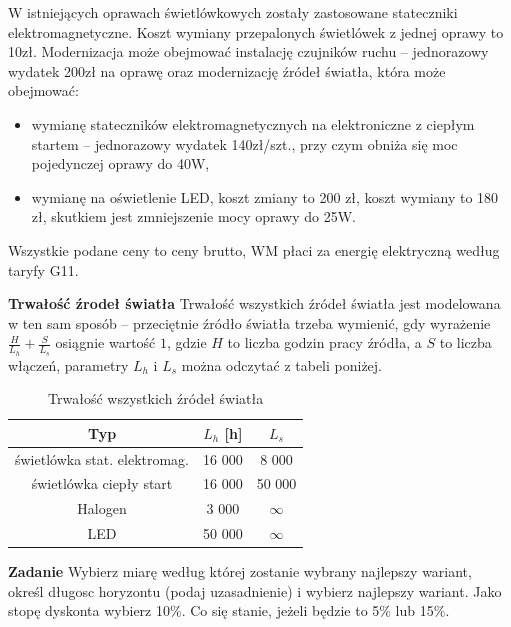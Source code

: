 \documentclass[
    12pt, %
]{../fphw}
\begin{document}
W istniejących oprawach świetlówkowych zostały zastosowane stateczniki elektromagnetyczne. Koszt wymiany przepalonych świetlówek z jednej
oprawy to 10zł. Modernizacja może obejmować instalację czujników ruchu
– jednorazowy wydatek 200zł na oprawę oraz modernizację źródeł światła,
która może obejmować:
\begin{itemize}
    \item wymianę stateczników elektromagnetycznych na elektroniczne z ciepłym startem
          – jednorazowy wydatek 140zł/szt., przy czym obniża się moc pojedynczej oprawy do 40W,
    \item wymianę na oświetlenie LED, koszt zmiany to 200 zł, koszt wymiany
          to 180 zł, skutkiem jest zmniejszenie mocy oprawy do 25W.
\end{itemize}
Wszystkie podane ceny to ceny brutto, WM płaci za energię elektryczną według taryfy G11.

\textbf{Trwałość źrodeł światła}
Trwałość wszystkich źródeł światła jest modelowana
w ten sam sposób – przeciętnie źródło światła trzeba wymienić, gdy
wyrażenie \(\frac{H}{L_h} + \frac{S}{L_s}\)
osiągnie wartość \(1\), gdzie \(H\) to liczba godzin pracy źródła,
a \(S\) to liczba włączeń, parametry \(L_h\) i \(L_s\) można odczytać z tabeli poniżej.
\begin{table}[H]
    \centering
    \begin{tabular}{| c | c | c |}
        \hline
        Typ                          & \(L_h\) [h] & \(L_s\)       \\
        \hline
        świetlówka stat. elektromag. & 16 000      & 8 000         \\
        świetlówka ciepły start      & 16 000      & 50 000        \\
        Halogen                      & 3 000       & \( \infty  \) \\
        LED                          & 50 000      & \( \infty  \) \\
        \hline
    \end{tabular}
    \caption{Trwałość wszystkich źródeł światła}
\end{table}

\textbf{Zadanie} Wybierz miarę według której zostanie wybrany najlepszy wariant,
określ długosc horyzontu (podaj uzasadnienie) i wybierz najlepszy wariant.
Jako stopę dyskonta wybierz 10\%. Co się stanie, jeżeli będzie to 5\% lub 15\%.
\end{document}
